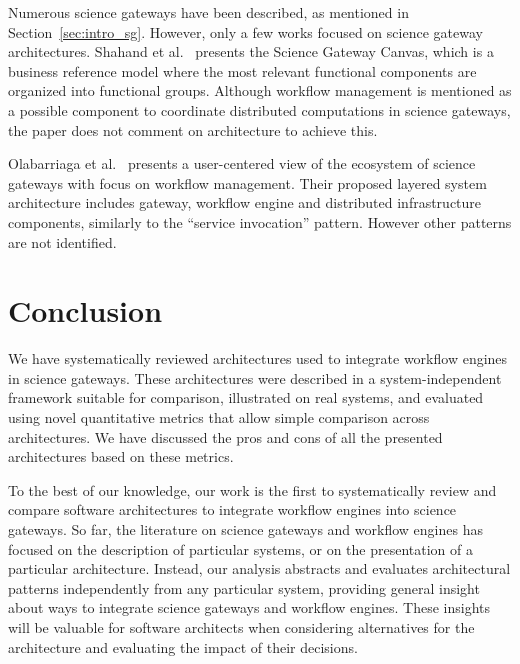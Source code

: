 \documentclass[preprint,3p,twocolumn]{elsarticle}
\begin{document}
Numerous science gateways have been described, as mentioned in
Section~\ref{sec:intro_sg}. However, only a few works focused on
science gateway architectures. Shahand et al.~\cite{shahand:2015ab}
presents the Science Gateway Canvas, which is a business reference
model where the most relevant functional components are organized into
functional groups. Although workflow management is mentioned as a
possible component to coordinate distributed computations in science
gateways, the paper does not comment on architecture to achieve this.

Olabarriaga et al.~\cite{olabarriaga2014} presents a user-centered
view of the ecosystem of science gateways with focus on workflow
management. Their proposed layered system architecture includes
gateway, workflow engine and distributed infrastructure components,
similarly to the ``service invocation'' pattern. However other patterns
are not identified.

\section{Conclusion}

We have systematically reviewed architectures used to integrate
workflow engines in science gateways. These architectures were
described in a system-independent framework suitable for comparison,
illustrated on real systems, and evaluated using novel quantitative
metrics that allow simple comparison across architectures. We have
discussed the pros and cons of all the presented architectures based
on these metrics.

To the best of our knowledge, our work is the first to systematically
review and compare software architectures  to integrate workflow
engines into science gateways. So far, the literature on science gateways and
workflow engines has focused on the description of particular systems,
or on the presentation of a particular architecture.  Instead, our
analysis abstracts and evaluates architectural patterns independently
from any particular system, providing general insight about ways to integrate
science gateways and workflow engines. These insights will be valuable
for software architects when considering alternatives for the architecture and evaluating the impact of their decisions.

\end{document}
